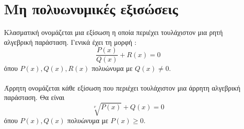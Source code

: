 \section{Μη πολυωνυμικές εξισώσεις}
\orismoi
{}
Κλασματική ονομάζεται μια εξίσωση η οποία περιέχει τουλάχιστον μια ρητή αλγεβρική παράσταση. Γενικά έχει τη μορφή :
\[ \dfrac{P(x)}{Q(x)}+R(x)= 0\]
όπου $ P(x),Q(x),R(x) $ πολυώνυμα με $ Q(x)\neq0 $.\\\\
Άρρητη ονομάζεται κάθε εξίσωση που περιέχει τουλάχιστον μια άρρητη αλγεβρική παράσταση. Θα είναι
\[ \sqrt[\nu]{P(x)}+Q(x)=0 \]
όπου $ P(x),Q(x) $ πολυώνυμα με $ P(x)\geq0 $.